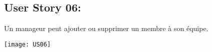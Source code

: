 \newpage{}
\subsection{User Story 06:}
Un manageur peut ajouter ou supprimer un membre à son équipe.


  \begin{center}
        \texttt{[image: US06]}
  \end{center}